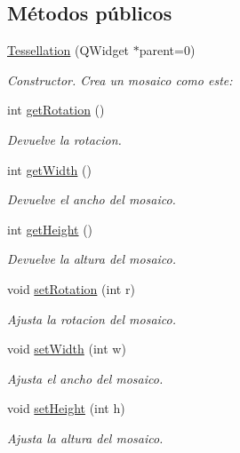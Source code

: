 \subsection*{Métodos públicos}
\begin{DoxyCompactItemize}
\item 
\hyperlink{class_tessellation_a3d77f5ad7aa19936ab47b43b7251526f}{Tessellation} (Q\+Widget $\ast$parent=0)
\begin{DoxyCompactList}\small\item\em Constructor. Crea un mosaico como este\+:  \end{DoxyCompactList}\item 
int \hyperlink{class_tessellation_a7d911890db50eb39146c1ec2d771a7dd}{get\+Rotation} ()
\begin{DoxyCompactList}\small\item\em Devuelve la rotacion. \end{DoxyCompactList}\item 
int \hyperlink{class_tessellation_a9280b338ed41af0ec33e81391e76f82a}{get\+Width} ()
\begin{DoxyCompactList}\small\item\em Devuelve el ancho del mosaico. \end{DoxyCompactList}\item 
int \hyperlink{class_tessellation_a5fbfd2325a4ba0b7d4e66ce98e474c56}{get\+Height} ()
\begin{DoxyCompactList}\small\item\em Devuelve la altura del mosaico. \end{DoxyCompactList}\item 
void \hyperlink{class_tessellation_a4ee5bac93c53b25ff1d4ec8a43fdad64}{set\+Rotation} (int r)
\begin{DoxyCompactList}\small\item\em Ajusta la rotacion del mosaico. \end{DoxyCompactList}\item 
void \hyperlink{class_tessellation_aa035a163e76a1616c58d20938b2853aa}{set\+Width} (int w)
\begin{DoxyCompactList}\small\item\em Ajusta el ancho del mosaico. \end{DoxyCompactList}\item 
void \hyperlink{class_tessellation_a57273ef613b239b6e16ea97085d2f4df}{set\+Height} (int h)
\begin{DoxyCompactList}\small\item\em Ajusta la altura del mosaico. \end{DoxyCompactList}\end{DoxyCompactItemize}
